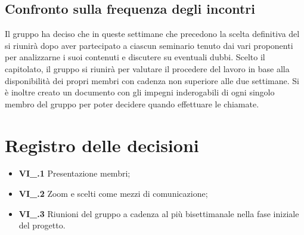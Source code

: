 \subsection{Confronto sulla frequenza degli incontri}
Il gruppo ha deciso che in queste settimane che precedono la scelta definitiva del  si riunirà dopo aver partecipato a ciascun seminario tenuto dai vari proponenti per analizzarne i suoi contenuti e discutere su eventuali dubbi. Scelto il capitolato, il gruppo si riunirà per valutare il procedere del lavoro in base alla disponibilità dei propri membri con cadenza non superiore alle due settimane. Si è inoltre creato un documento con gli impegni inderogabili di ogni singolo membro del gruppo per poter decidere quando effettuare le chiamate.

\section{Registro delle decisioni}
\begin{itemize}
  \item \textbf{VI\_\Data.1} Presentazione membri;
  \item \textbf{VI\_\Data.2} Zoom e  scelti come mezzi di comunicazione;
  \item \textbf{VI\_\Data.3} Riunioni del gruppo a cadenza al più bisettimanale nella fase iniziale del progetto.
\end{itemize}
